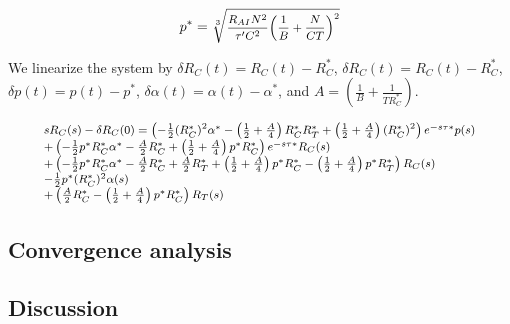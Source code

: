 \begin{equation}
\small
{p^*} = \sqrt[3]{{\frac{{{R_{AI}}{N^2}}}{{\tau '{C^2}}}{{\left( {\frac{1}{B} + \frac{N}{{CT}}} \right)}^2}}}
\end{equation}

We linearize the system by $\delta {R_C}(t) = {R_C}(t) - R_C^*$, $\delta {R_C}(t) = {R_C}(t) - R_C^*$,
$\delta p(t) = p(t) - p^*$, $\delta \alpha (t) = \alpha (t) - \alpha^*$, and $A = \left( {\frac{1}{B} + \frac{1}{{TR_C^*}}} \right)$.

\begin{equation}
\small
\begin{array}{l}
s{R_C}(s) - \delta {R_C}(0) = \left( { - \frac{1}{2}{{(R_C^*)}^2}{\alpha ^*} - \left( {\frac{1}{2} + \frac{A}{4}} \right)R_C^*R_T^* + \left( {\frac{1}{2} + \frac{A}{4}} \right){{(R_C^*)}^2}} \right){e^{ - s\tau *}}p(s)\\
 + \left( { - \frac{1}{2}{p^*}R_C^*{\alpha ^*} - \frac{A}{2}R_C^* + \left( {\frac{1}{2} + \frac{A}{4}} \right){p^*}R_C^*} \right){e^{ - s\tau *}}{R_C}(s)\\
 + \left( { - \frac{1}{2}{p^*}R_C^*{\alpha ^*} - \frac{A}{2}R_C^* + \frac{A}{2}R_T^* + \left( {\frac{1}{2} + \frac{A}{4}} \right){p^*}R_C^* - \left( {\frac{1}{2} + \frac{A}{4}} \right){p^*}R_T^*} \right){R_C}(s)\\
 - \frac{1}{2}{p^*}{(R_C^*)^2}\alpha (s)\\
 + \left( {\frac{A}{2}R_C^* - \left( {\frac{1}{2} + \frac{A}{4}} \right){p^*}R_C^*} \right){R_T}(s)
\end{array}
\end{equation}


\subsection{Convergence analysis}

\subsection{Discussion}

